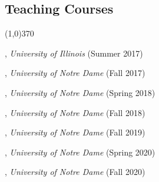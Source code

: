 \documentclass[10pt]{article}
\newenvironment{myindentpar}[1]%
{\begin{list}{}%
         {\setlength{\leftmargin}{#1}}%
         \item[]%
}
{\end{list}}
\newcounter{list}
\newcommand{\hide}[1]{}
\begin{document}
\subsection{\sc Teaching Courses}
\vspace{-0.4cm} \line(1,0){370} \vspace{-0.1cm}

\begin{myindentpar}{0.75cm}

\hspace{-0.75cm}{\bf CS 412 Introduction to Data Mining}, \textit{University of Illinois} (Summer 2017)
	
\hspace{-0.75cm}{\bf CSE 40647/60647 Data Science}, \textit{University of Notre Dame} (Fall 2017)

\hspace{-0.75cm}{\bf CSE 40647/60647 Data Science}, \textit{University of Notre Dame} (Spring 2018)

\hspace{-0.75cm}{\bf CSE 40647/60647 Data Science}, \textit{University of Notre Dame} (Fall 2018)

\hspace{-0.75cm}{\bf CSE 40647/60647 Data Science}, \textit{University of Notre Dame} (Fall 2019)

\hspace{-0.75cm}{\bf CSE 60326 Computational Behavior Modeling}, \textit{University of Notre Dame} (Spring 2020)

\hspace{-0.75cm}{\bf CSE 40647/60647 Data Science}, \textit{University of Notre Dame} (Fall 2020)

\end{myindentpar}

\hide{
\subsection{\sc Media Coverage}
\vspace{-0.4cm} \line(1,0){370} \vspace{-0.1cm}

\begin{myindentpar}{0.75cm}
{\em With modern media, press coverage sometimes spreads far and wide. There are often more outlets reporting than can be captured. This section therefore lists only a representative article (or two) of the total press coverage.}

\hspace{-0.75cm} XXX (XXX 2019) 
\hspace{0.75cm}{\em XXX}

\hspace{-0.75cm} XXX (XXX 2019) 

\url{https://www.XXX.com/}

\end{myindentpar}
}
\end{document}
